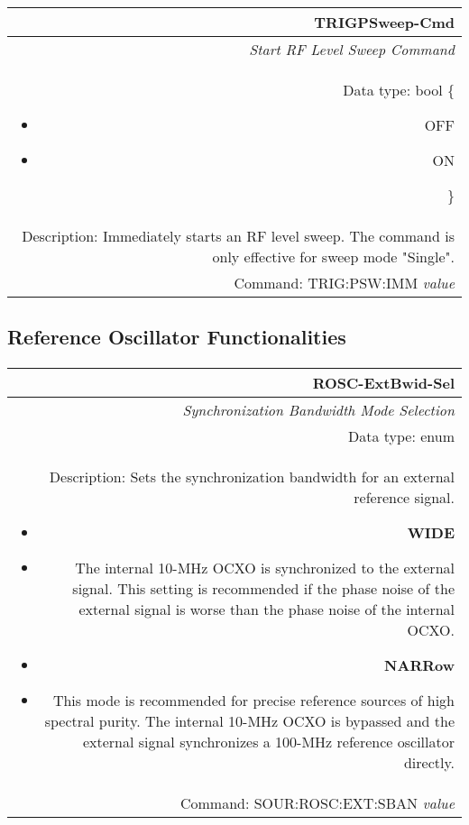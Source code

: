 \documentclass[openany]{article}
\begin{document}
%
		\begin{tabular}{N}
			\hline
			\bfseries TRIGPSweep-Cmd \\ \hline
			\emph{Start RF Level Sweep Command} \\
			Data type: bool \{\begin{itemize}[noitemsep]
				\small
				\item[] OFF
				\item[] ON
			\end{itemize}\} \\
			Description: Immediately starts an RF level sweep. The command is only effective for sweep mode "Single". \\
			Command: TRIG:PSW:IMM \emph{value} \\

		\end{tabular}
%
	\subsection{Reference Oscillator Functionalities}\label{pvgroup:function} %

		\paragraph{} %

%
		\begin{tabular}{N}
			\hline
			\bfseries ROSC-ExtBwid-Sel \\ \hline
			\emph{Synchronization Bandwidth Mode Selection} \\
			Data type: enum \\   
			Description: Sets the synchronization bandwidth for an external reference signal.\begin{itemize}[noitemsep]
				\small
				\item[] \textbf{WIDE}
				\item[] The internal 10-MHz OCXO is synchronized to the external signal. This setting is recommended if the phase noise of the external signal is worse than the phase noise of the internal OCXO.
                                \item[] \textbf{NARRow}
				\item[] This mode is recommended for precise reference sources of high spectral purity. The internal 10-MHz OCXO is bypassed and the external signal synchronizes a 100-MHz reference oscillator directly.
			\end{itemize} \\
			Command: SOUR:ROSC:EXT:SBAN \emph{value} \\

		\end{tabular}
\end{document}
